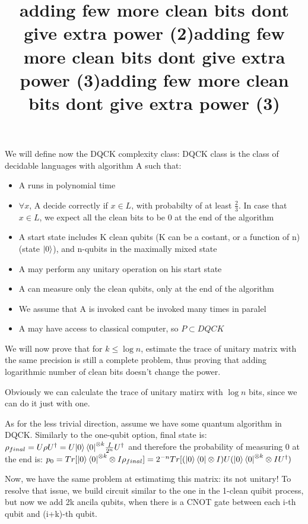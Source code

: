 \documentclass{article}
\begin{document}
{\title{adding few more clean bits dont give extra power (2)}
We will define now the DQCK complexity class:
DQCK class is the class of decidable languages with algorithm A such that:
\begin{itemize}
\item A runs in polynomial time
\item \(\forall x\), A decide correctly if \(x \in L\), with probabilty of at least \(\frac{2}{3}\). 
In case that \(x \in L\), we expect all the clean bits to be 0 at the end of the algorithm
\item A start state includes K clean qubits (K can be a costant, or a function of n) (state \(\left\vert{0}\right\rangle\)), and n-qubits in the maximally mixed state
\item A may perform any unitary operation on his start state
\item A can measure only the clean qubits, only at the end of the algorithm
\item We assume that A is invoked cant be invoked many times in paralel
\item A may have access to classical computer, so \(P \subset DQCK\) 
\end{itemize}  


\title{adding few more clean bits dont give extra power (3)}
We will now prove that for \(k \leq \log{n}\), estimate the trace of unitary matrix with the same precision is still a complete problem, thus proving that adding logarithmic number of clean bits doesn't change the power. 

Obviously we can calculate the trace of unitary matirx with \(\log{n}\) bits, since we can do it just with one. 


\title{adding few more clean bits dont give extra power (3)}
As for the less trivial direction, assume we have some quantum algorithm in DQCK.
Similarly to the one-qubit option, final state is:
\(\rho_{final} = U\rho{U^\dagger} = U{\left\vert{0}\right\rangle\left\langle{0}\right\vert}^{\otimes k}\frac{I}{2^n}{U^\dagger}\)
and therefore the probability of measuring 0 at the end is:
\(p_{0} = Tr[{\Ket{0}\Bra{0}}^{\otimes k} \otimes I\rho_{final}] = 2^{-n}Tr[(\Ket{0}\Bra{0}\otimes I)U({\Ket{0}\Bra{0}}^{\otimes k}\otimes I{U^\dagger})\)

Now, we have the same problem at estimatimg this matrix: its not unitary!
To resolve that issue, we build circuit similar to the one in the 1-clean quibit process,
but now we add 2k ancila qubits, when there is a CNOT gate between each i-th qubit and (i+k)-th qubit.



}
\end{document}
